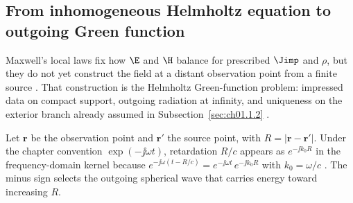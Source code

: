\subsection{From inhomogeneous Helmholtz equation to outgoing Green function}
\label{sec:ch01.1.1c}

Maxwell's local laws fix how $\E$ and $\H$ balance for prescribed $\Jimp$ and $\rho$, but they do not yet construct the field at a distant observation point from a finite source \cite{stratton1941,maxwell1873}. That construction is the Helmholtz Green-function problem: impressed data on compact support, outgoing radiation at infinity, and uniqueness on the exterior branch already assumed in Subsection~\ref{sec:ch01.1.2} \cite{stratton1941,jackson1999}.

Let $\mathbf{r}$ be the observation point and $\mathbf{r}'$ the source point, with $R=|\mathbf{r}-\mathbf{r}'|$. Under the chapter convention $\exp(-\jj\omega t)$, retardation $R/c$ appears as $e^{-\jj k_0 R}$ in the frequency-domain kernel because $e^{-\jj\omega(t-R/c)}=e^{-\jj\omega t}\,e^{-\jj k_0 R}$ with $k_0=\omega/c$ \cite{stratton1941,jackson1999}. The minus sign selects the outgoing spherical wave that carries energy toward increasing $R$.

